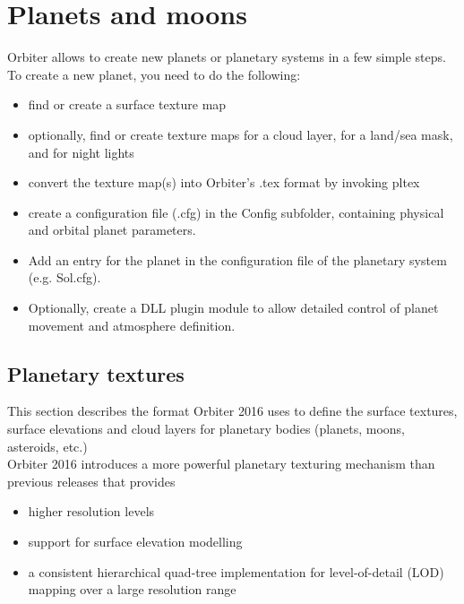 \documentclass[Orbiter Developer Manual.tex]{subfiles}
\begin{document}
\section{Planets and moons}
Orbiter allows to create new planets or planetary systems in a few simple steps. To create a new planet, you need to do the following:

\begin{itemize}
\item find or create a surface texture map
\item optionally, find or create texture maps for a cloud layer, for a land/sea mask, and for night lights
\item convert the texture map(s) into Orbiter's .tex format by invoking pltex
\item create a configuration file (.cfg) in the Config subfolder, containing physical and orbital planet parameters.
\item Add an entry for the planet in the configuration file of the planetary system (e.g. Sol.cfg).
\item Optionally, create a DLL plugin module to allow detailed control of planet movement and atmosphere definition.
\end{itemize}


\subsection{Planetary textures}
This section describes the format Orbiter 2016 uses to define the surface textures, surface elevations and cloud layers for planetary bodies (planets, moons, asteroids, etc.)\\
Orbiter 2016 introduces a more powerful planetary texturing mechanism than previous releases that provides

\begin{itemize}
\item higher resolution levels
\item support for surface elevation modelling
\item a consistent hierarchical quad-tree implementation for level-of-detail (LOD) mapping over a large resolution range
\end{itemize}
\end{document}
